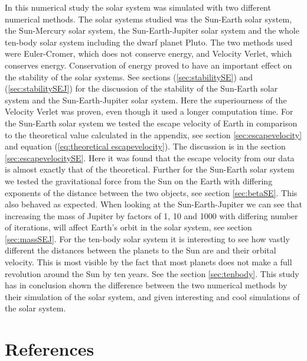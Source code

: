 \documentclass{article}
\begin{document}
    In this numerical study the solar system was simulated with two different numerical methods. The solar systems studied was the Sun-Earth solar system, the Sun-Mercury solar system, the Sun-Earth-Jupiter solar system and the whole ten-body solar system including the dwarf planet Pluto. The two methods used were Euler-Cromer, which does not conserve energy, and Velocity Verlet, which conserves energy. Conservation of energy proved to have an important effect on the stability of the solar systems. See sections (\ref{sec:stabilitySE}) and (\ref{sec:stabilitySEJ}) for the discussion of the stability of the Sun-Earth solar system and the Sun-Earth-Jupiter solar system. Here the superiourness of the Velocity Verlet was proven, even though it used a longer computation time. For the Sun-Earth solar system we tested the escape velocity of Earth in comparison to the theoretical value calculated in the appendix, see section \ref{sec:escapevelocity} and equation (\ref{eq:theoretical escapevelocity}). The discussion is in the section \ref{sec:escapevelocitySE}. Here it was found that the escape velocity from our data is almost exactly that of the theoretical. Further for the Sun-Earth solar system we tested the gravitational force from the Sun on the Earth with differing exponents of the distance between the two objects, see section \ref{sec:betaSE}. This also behaved as expected. When looking at the Sun-Earth-Jupiter we can see that increasing the mass of Jupiter by factors of 1, 10 and 1000 with differing number of iterations, will affect Earth's orbit in the solar system, see section \ref{sec:massSEJ}. For the ten-body solar system it is interesting to see how vastly different the distances between the planets to the Sun are and their orbital velocity. This is most visible by the fact that most planets does not make a full revolution around the Sun by ten years. See the section \ref{sec:tenbody}. This study has in conclusion shown the difference between the two numerical methods by their simulation of the solar system, and given interesting and cool simulations of the solar system.



\vspace{1cm}

\section{References} \label{sec:References}
\end{document}

